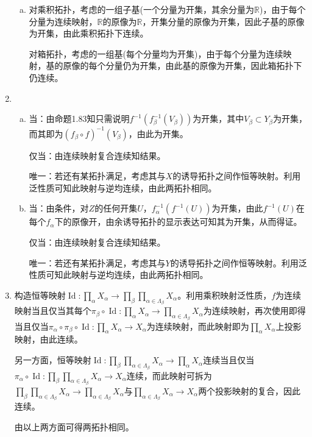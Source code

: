 \documentclass[a4paper,UTF8,fontset=windows]{ctexart}
\DeclareMathOperator{\Id}{Id}
\begin{document}
\begin{enumerate}[(1)]
\begin{enumerate}[(a)]
    \item
    对乘积拓扑，考虑的一组子基(一个分量为开集，其余分量为$\mathbb{R}$)，由于每个分量为连续映射，$\mathbb{R}$的原像为$\mathbb{R}$，开集分量的原像为开集，因此子基的原像为开集，由此乘积拓扑下连续。
    
    对箱拓扑，考虑的一组基(每个分量均为开集)，由于每个分量为连续映射，基的原像的每个分量仍为开集，由此基的原像为开集，因此箱拓扑下仍连续。
    \end{enumerate}
    
    \item
    \begin{enumerate}[(a)]
    \item
    当：由命题1.83知只需说明$f^{-1}(f_\beta^{-1}(V_\beta))$为开集，其中$V_\beta\subset Y_\beta$为开集，而其即为$(f_\beta\circ f)^{-1}(V_\beta)$，由此为开集。
    
    仅当：由连续映射复合连续知结果。
    
    唯一：若还有某拓扑满足，考虑其与$X$的诱导拓扑之间作恒等映射。利用泛性质可知此映射与逆均连续，由此两拓扑相同。
    
    \item
    当：由条件，对$Z$的任何开集$U$，$f_\alpha^{-1}(f^{-1}(U))$为开集，由此$f^{-1}(U)$在每个$f_\alpha$下的原像开，由余诱导拓扑的显示表达可知其为开集，从而得证。
    
    仅当：由连续映射复合连续知结果。
    
    唯一：若还有某拓扑满足，考虑其与$Y$的诱导拓扑之间作恒等映射。利用泛性质可知此映射与逆均连续，由此两拓扑相同。
    \end{enumerate}
    
    \item
    构造恒等映射$\Id:\prod_{\alpha}X_\alpha\to\prod_{\beta}\prod_{\alpha\in\Lambda_\beta}X_\alpha$。利用乘积映射泛性质，$f$为连续映射当且仅当其每个$\pi_\beta\circ\Id:\prod_{\alpha}X_\alpha\to\prod_{\alpha\in\Lambda_\beta}X_\alpha$为连续映射，再次使用即得当且仅当$\pi_\alpha\circ\pi_\beta\circ\Id:\prod_{\alpha}X_\alpha\to X_\alpha$为连续映射，而此映射即为$\prod_{\alpha}X_\alpha$上投影映射，由此连续。
    
    另一方面，恒等映射$\Id:\prod_{\beta}\prod_{\alpha\in\Lambda_\beta}X_\alpha\to\prod_{\alpha}X_\alpha$连续当且仅当$\pi_\alpha\circ\Id:\prod_{\beta}\prod_{\alpha\in\Lambda_\beta}X_\alpha\to X_\alpha$连续，而此映射可拆为$\prod_{\beta}\prod_{\alpha\in\Lambda_\beta}X_\alpha\to\prod_{\alpha\in\Lambda_\beta}X_\alpha$与$\prod_{\alpha\in\Lambda_\beta}X_\alpha\to X_\alpha$两个投影映射的复合，因此连续。
    
    由以上两方面可得两拓扑相同。
\end{enumerate}
\end{document}
